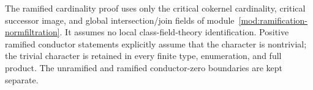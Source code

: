 \begin{theorem}
The ramified cardinality proof uses only the critical cokernel cardinality,
critical successor image, and global intersection/join fields of
module~\ref{mod:ramification-normfiltration}.  It assumes no local
class-field-theory identification.  Positive ramified conductor statements
explicitly assume that the character is nontrivial; the trivial character
is retained in every finite type, enumeration, and full product.  The
unramified and ramified conductor-zero boundaries are kept separate.
\end{theorem}

